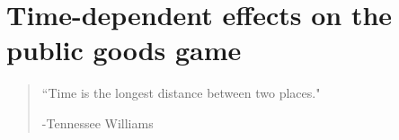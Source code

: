 \chapter{Time-dependent effects on the public goods game} %
\label{chap:TimeEffects}



\begin{quotation}

    \begin{flushright}
    \begin{minipage}[t][5cm][b]{0.5\textwidth}
    { ``Time is the longest distance between two places."}
    
    \bigskip
    
    -{\small  Tennessee Williams}
    \end{minipage}
    \end{flushright}
    
    \vspace{0.5cm}
\end{quotation}






\begin{thebibliography}{04}


\end{thebibliography}






